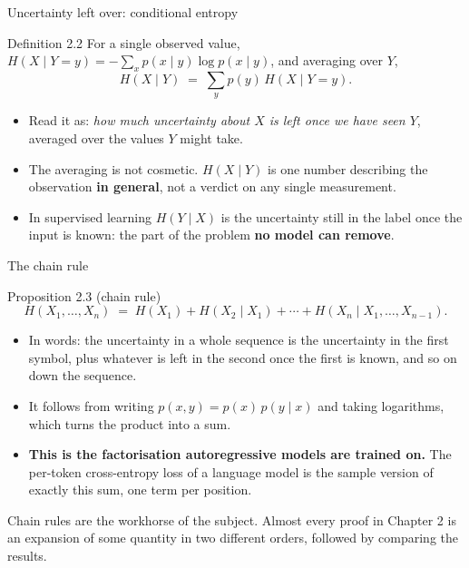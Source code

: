 \documentclass[aspectratio=169,9pt]{beamer}
\newcommand{\orange}[1]{\textcolor{AmazonOrange}{\textbf{#1}}}
\newcommand{\blue}[1]{\textcolor{densityblue}{\textbf{#1}}}
\newcommand{\muted}[1]{\textcolor{EPICMuted}{#1}}
\begin{document}
\begin{frame}{Uncertainty left over: conditional entropy}
\begin{block}{Definition 2.2}
For a single observed value, $H(X \mid Y = y) = -\sum_x p(x \mid y)\log p(x \mid y)$, and averaging over $Y$,
\[
    H(X \mid Y) \;=\; \sum_y p(y)\, H(X \mid Y = y).
\]
\end{block}
\pause
\vspace{0.1cm}
\begin{itemize}
    \item Read it as: \textit{how much uncertainty about $X$ is left once we have seen $Y$}, averaged over the
    values $Y$ might take.
    \pause
    \item The averaging is not cosmetic. $H(X \mid Y)$ is one number describing the observation
    \blue{in general}, not a verdict on any single measurement.
    \pause
    \item In supervised learning $H(Y \mid X)$ is the uncertainty still in the label once the input is known:
    the part of the problem \orange{no model can remove}.
\end{itemize}
\end{frame}

\begin{frame}{The chain rule}
\begin{block}{Proposition 2.3 (chain rule)}
\[
    H(X_1, \dots, X_n) \;=\; H(X_1) + H(X_2 \mid X_1) + \cdots + H(X_n \mid X_1, \dots, X_{n-1}).
\]
\end{block}
\pause
\vspace{0.1cm}
\begin{itemize}
    \item In words: the uncertainty in a whole sequence is the uncertainty in the first symbol, plus whatever
    is left in the second once the first is known, and so on down the sequence.
    \pause
    \item It follows from writing $p(x,y) = p(x)\,p(y \mid x)$ and taking logarithms, which turns the product
    into a sum.
    \pause
    \item \orange{This is the factorisation autoregressive models are trained on.} The per-token cross-entropy
    loss of a language model is the sample version of exactly this sum, one term per position.
\end{itemize}
\vspace{0.3cm}
\pause
\muted{Chain rules are the workhorse of the subject. Almost every proof in Chapter 2 is an expansion of some
quantity in two different orders, followed by comparing the results.}
\end{frame}
\end{document}
